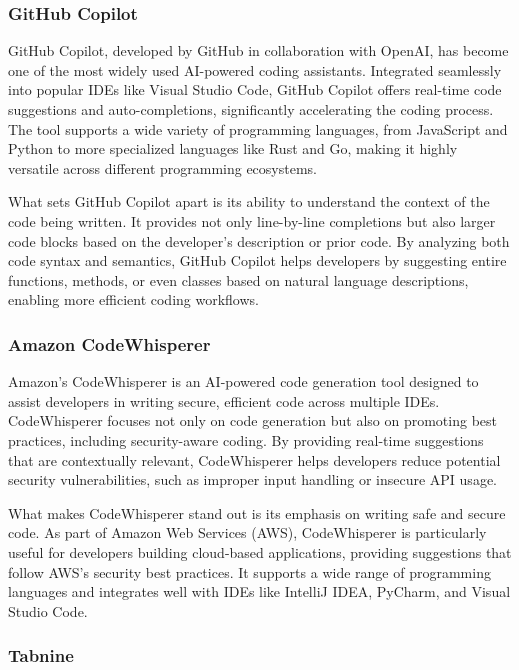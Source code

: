 \subsubsection{GitHub Copilot}

GitHub Copilot, developed by GitHub in collaboration with OpenAI, has become one of the most widely used AI-powered coding assistants. Integrated seamlessly into popular IDEs like Visual Studio Code, GitHub Copilot offers real-time code suggestions and auto-completions, significantly accelerating the coding process. The tool supports a wide variety of programming languages, from JavaScript and Python to more specialized languages like Rust and Go, making it highly versatile across different programming ecosystems.

What sets GitHub Copilot apart is its ability to understand the context of the code being written. It provides not only line-by-line completions but also larger code blocks based on the developer's description or prior code. By analyzing both code syntax and semantics, GitHub Copilot helps developers by suggesting entire functions, methods, or even classes based on natural language descriptions, enabling more efficient coding workflows.

\subsubsection{Amazon CodeWhisperer}

Amazon's CodeWhisperer is an AI-powered code generation tool designed to assist developers in writing secure, efficient code across multiple IDEs. CodeWhisperer focuses not only on code generation but also on promoting best practices, including security-aware coding. By providing real-time suggestions that are contextually relevant, CodeWhisperer helps developers reduce potential security vulnerabilities, such as improper input handling or insecure API usage.

What makes CodeWhisperer stand out is its emphasis on writing safe and secure code. As part of Amazon Web Services (AWS), CodeWhisperer is particularly useful for developers building cloud-based applications, providing suggestions that follow AWS's security best practices. It supports a wide range of programming languages and integrates well with IDEs like IntelliJ IDEA, PyCharm, and Visual Studio Code.

\subsubsection{Tabnine}

